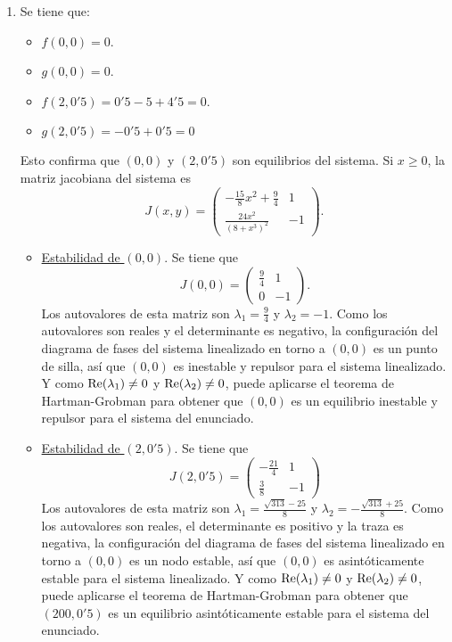 \documentclass[11pt]{report}
\begin{document}
\begin{solution}
    \hfill
    \begin{enumerate}
        \item Se tiene que:
        \begin{itemize}
            \item $f(0,0) = 0$.
            \item $g(0,0) = 0$.
            \item $f(2,0'5) = 0'5-5+4'5 = 0$.
            \item $g(2,0'5) = -0'5+0'5 = 0$
        \end{itemize}
        Esto confirma que $(0,0)$ y $(2,0'5)$ son equilibrios del sistema. Si $x \geq 0$, la matriz jacobiana del sistema es
        \[J(x,y) = \left(\begin{array}{cc}
            -\frac{15}{8}x^2+\frac{9}{4} & 1 \\
            \frac{24x^2}{(8+x^3)^2} & -1
        \end{array}\right).\]
        \begin{itemize}
            \item \underline{Estabilidad de $(0,0)$}. Se tiene que
            \[J(0,0) = \left(\begin{array}{cc}
                \frac{9}{4} & 1 \\
                0 & -1
            \end{array}\right).\]
            Los autovalores de esta matriz son $\lambda_1 = \frac{9}{4}$ y $\lambda_ 2 = -1$. Como los autovalores son reales y el determinante es negativo, la configuración del diagrama de fases del sistema linealizado en torno a $(0,0)$ es un punto de silla, así que $(0,0)$ es inestable y repulsor para el sistema linealizado. Y como $\textup{Re}(\lambda_1)\neq 0$ y $\textup{Re}(\lambda_2)\neq 0$, puede aplicarse el teorema de Hartman-Grobman para obtener que $(0,0)$ es un equilibrio inestable y repulsor para el sistema del enunciado.
            \item \underline{Estabilidad de $(2,0'5)$}. Se tiene que
            \[J(2,0'5) = \left(\begin{array}{cc}
                -\frac{21}{4} & 1 \\
                \frac{3}{8} & -1
            \end{array}\right)\]
            Los autovalores de esta matriz son $\lambda_1 = \frac{\sqrt{313}-25}{8}$ y $\lambda_2 = -\frac{\sqrt{313}+25}{8}$. Como los autovalores son reales, el determinante es positivo y la traza es negativa, la configuración del diagrama de fases del sistema linealizado en torno a $(0,0)$ es un nodo estable, así que $(0,0)$ es asintóticamente estable para el sistema linealizado. Y como $\textup{Re}(\lambda_1)\neq 0$ y $\textup{Re}(\lambda_2)\neq 0$, puede aplicarse el teorema de Hartman-Grobman para obtener que $(200,0'5)$ es un equilibrio asintóticamente estable para el sistema del enunciado.

\end{itemize}
\end{enumerate}
\end{solution}
\end{document}
